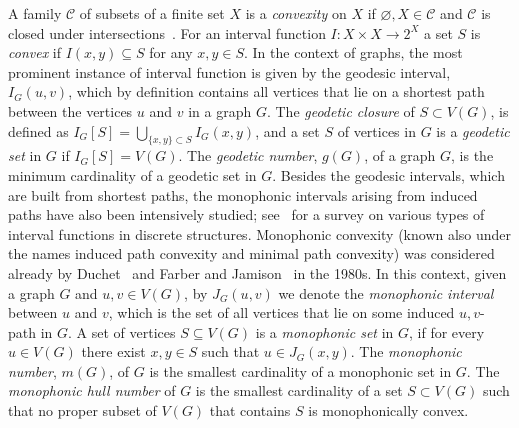 \documentclass[a4paper,11pt]{article}
\renewcommand{\emptyset}{\varnothing}
\begin{document}
A family $\mathcal{C}$ of subsets of a finite set $X$ is a {\em convexity} on $X$ if $\emptyset ,X \in {\mathcal{C}}$ and $\mathcal{C}$ is closed under intersections~\cite{vel-93}. For an interval function $I: X \times X \to 2^X$ a   set $S$ is {\em convex} if $I(x,y) \subseteq S$ for any $x,y \in S$. In the context of graphs, the most prominent instance of interval function is given by the geodesic interval, $I_{G}(u,v)$, which by definition contains all vertices that lie on a shortest path between the vertices $u$ and $v$ in a graph $G$. The {\em geodetic closure} of $S\subset V(G)$, is defined as $I_G \left[ S \right]=\bigcup_{\{x,y\}\subset S}{I_G(x,y)}$, and a set $S$ of vertices in $G$ is a {\it geodetic set} in $G$ if $I_G \left[ S \right] = V (G)$. The {\em geodetic number}, $g(G)$, of a graph $G$, is the minimum cardinality of a geodetic set in $G$.
Besides the geodesic intervals, which are built from shortest paths, the monophonic intervals arising from induced paths have also been intensively studied; see~\cite{chmusi-05} for a survey on various types of interval functions in discrete structures. Monophonic convexity (known also under the names induced path convexity and minimal path convexity) was considered already by Duchet~\cite{Duchet} and Farber and Jamison~\cite{FJ} in the 1980s. 
In this context, given a graph $G$ and $u,v \in V(G)$, by $J_G(u,v)$ we denote the {\it monophonic interval} between $u$ and $v$, which is the set of all vertices that lie on some induced $u,v$-path in $G$. A set of vertices $S\subseteq V(G)$ is a  {\em monophonic set} in $G$, if for every $u\in V(G)$ there exist $x,y\in S$ such that $u\in J_G(x,y)$. The {\it monophonic number}, $m(G)$, of $G$ is the smallest cardinality of a monophonic set in $G$. The {\em monophonic hull number} of $G$ is the smallest cardinality of a set $S\subset V(G)$ such that no proper subset of $V(G)$ that contains $S$ is monophonically convex. 
\end{document}
